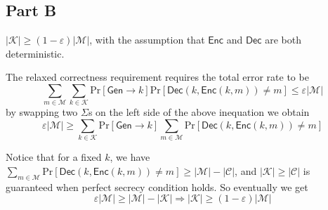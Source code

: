 \documentclass[8pt]{article}
\theoremstyle{compact}
\def\le{\leqslant}
\def\ge{\geqslant}
\def\Pr#1{\text{Pr}\left[{#1}\right]}
\def\Enc{\textsf{Enc}}
\def\Dec{\textsf{Dec}}
\def\Gen{\textsf{Gen}}
\begin{document}
\subsection*{Part B}

$|\mathcal K| \ge (1 - \varepsilon)|\mathcal M|$, with the assumption that $\Enc$ and $\Dec$ are both deterministic.

The relaxed correctness requirement requires the total error rate to be $$\sum_{m \in \mathcal M}\sum_{k \in \mathcal K} \Pr{\Gen \to k} \Pr{\Dec(k, \Enc(k, m)) \neq m} \le \varepsilon |\mathcal M|$$
by swapping two $\Sigma$s on the left side of the above inequation we obtain $$\varepsilon|\mathcal M| \ge \sum_{k \in \mathcal K}\Pr{\Gen \to k}\sum_{m \in \mathcal M}\Pr{\Dec(k, \Enc(k, m)) \neq m}$$

Notice that for a fixed $k$, we have $\sum\limits_{m \in \mathcal M}\Pr{\Dec(k, \Enc(k, m)) \neq m} \ge |\mathcal M| - |\mathcal C|$, and $|\mathcal K| \ge |\mathcal C|$ is guaranteed when perfect secrecy condition holds. So eventually we get $$\varepsilon|\mathcal M| \ge |\mathcal M| - |\mathcal K| \Rightarrow |\mathcal K| \ge (1 - \varepsilon)|\mathcal M|$$
\end{document}
